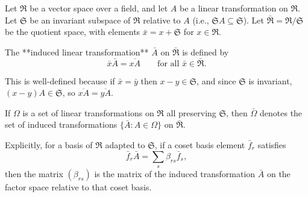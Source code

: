Let $\mathfrak{R}$ be a vector space over a field, and let $A$ be a linear transformation on $\mathfrak{R}$. Let $\mathfrak{S}$ be an invariant subspace of $\mathfrak{R}$ relative to $A$ (i.e., $\mathfrak{S} A \subseteq \mathfrak{S}$). Let $\bar{\mathfrak{R}} = \mathfrak{R}/\mathfrak{S}$ be the quotient space, with elements $\bar{x} = x + \mathfrak{S}$ for $x \in \mathfrak{R}$.

The **induced linear transformation** $\bar{A}$ on $\bar{\mathfrak{R}}$ is defined by
$$\bar{x} \bar{A} = \overline{xA} \qquad \text{for all } \bar{x} \in \bar{\mathfrak{R}}.$$

This is well-defined because if $\bar{x} = \bar{y}$ then $x - y \in \mathfrak{S}$, and since $\mathfrak{S}$ is invariant, $(x - y)A \in \mathfrak{S}$, so $\overline{xA} = \overline{yA}$.

If $\Omega$ is a set of linear transformations on $\mathfrak{R}$ all preserving $\mathfrak{S}$, then $\bar{\Omega}$ denotes the set of induced transformations $\{\bar{A} : A \in \Omega\}$ on $\bar{\mathfrak{R}}$.

Explicitly, for a basis of $\mathfrak{R}$ adapted to $\mathfrak{S}$, if a coset basis element $\bar{f}_r$ satisfies
$$\bar{f}_r \bar{A} = \sum_{s} \beta_{rs} \bar{f}_s,$$
then the matrix $(\beta_{rs})$ is the matrix of the induced transformation $\bar{A}$ on the factor space relative to that coset basis.
